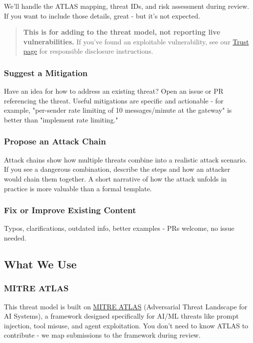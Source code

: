 We'll handle the ATLAS mapping, threat IDs, and risk assessment during review. If you want to include those details, great - but it's not expected.

\begin{quote}
\textbf{This is for adding to the threat model, not reporting live vulnerabilities.} If you've found an exploitable vulnerability, see our \href{https://trust.openclaw.ai}{Trust page} for responsible disclosure instructions.
\end{quote}


\subsubsection{Suggest a Mitigation}


Have an idea for how to address an existing threat? Open an issue or PR referencing the threat. Useful mitigations are specific and actionable - for example, "per-sender rate limiting of 10 messages/minute at the gateway" is better than "implement rate limiting."

\subsubsection{Propose an Attack Chain}


Attack chains show how multiple threats combine into a realistic attack scenario. If you see a dangerous combination, describe the steps and how an attacker would chain them together. A short narrative of how the attack unfolds in practice is more valuable than a formal template.

\subsubsection{Fix or Improve Existing Content}


Typos, clarifications, outdated info, better examples - PRs welcome, no issue needed.

\subsection{What We Use}


\subsubsection{MITRE ATLAS}


This threat model is built on \href{https://atlas.mitre.org/}{MITRE ATLAS} (Adversarial Threat Landscape for AI Systems), a framework designed specifically for AI/ML threats like prompt injection, tool misuse, and agent exploitation. You don't need to know ATLAS to contribute - we map submissions to the framework during review.


